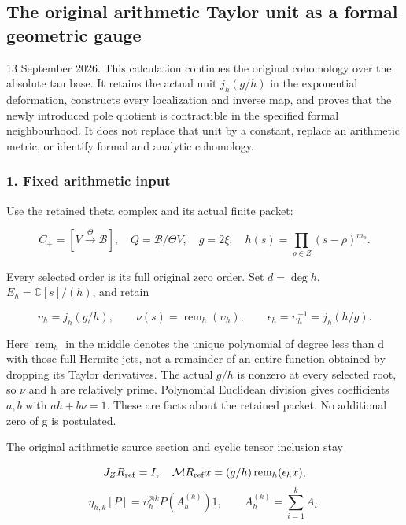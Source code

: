\subsection{The original arithmetic Taylor unit as a formal geometric gauge}\label{endpoint-f1_unit_gauge--the-original-arithmetic-taylor-unit-as-a-formal-geometric-gauge}

13 September 2026. This calculation continues the original cohomology over the absolute tau base. It retains the actual unit \(j_h(g/h)\) in the exponential deformation, constructs every localization and inverse map, and proves that the newly introduced pole quotient is contractible in the specified formal neighbourhood. It does not replace that unit by a constant, replace an arithmetic metric, or identify formal and analytic cohomology.

\subsubsection{1. Fixed arithmetic input}\label{endpoint-f1_unit_gauge--fixed-arithmetic-input}

Use the retained theta complex and its actual finite packet:

\[
C_+=[V\xrightarrow{\Theta}\mathscr B],\quad
Q=\mathscr B/\Theta V,\quad g=2\xi,\quad
h(s)=\prod_{\rho\in Z}(s-\rho)^{m_\rho}.
\tag{UG1}
\]

Every selected order is its full original zero order. Set \(d=\deg h\), \(E_h=\mathbb C[s]/(h)\), and retain

\[
\upsilon_h=j_h(g/h),\qquad
\nu(s)=\operatorname{rem}_h(\upsilon_h),\qquad
\epsilon_h=\upsilon_h^{-1}=j_h(h/g).
\tag{UG2}
\]

Here \(\operatorname{rem}_h\) in the middle denotes the unique polynomial of degree less than d with those full Hermite jets, not a remainder of an entire function obtained by dropping its Taylor derivatives. The actual \(g/h\) is nonzero at every selected root, so \(\nu\) and h are relatively prime. Polynomial Euclidean division gives coefficients \(a,b\) with \(a h+b\nu=1\). These are facts about the retained packet. No additional zero of g is postulated.

The original arithmetic source section and cyclic tensor inclusion stay

\[
J_ZR_{\rm ref}=I,\quad
\mathcal M R_{\rm ref}x=(g/h)\operatorname{rem}_h(\epsilon_hx),
\] \[
\eta_{h,k}[P]=\upsilon_h^{\otimes k}
 P(A_h^{(k)})1,\qquad A_h^{(k)}=\sum_{i=1}^k A_i.
\tag{UG3}
\]

